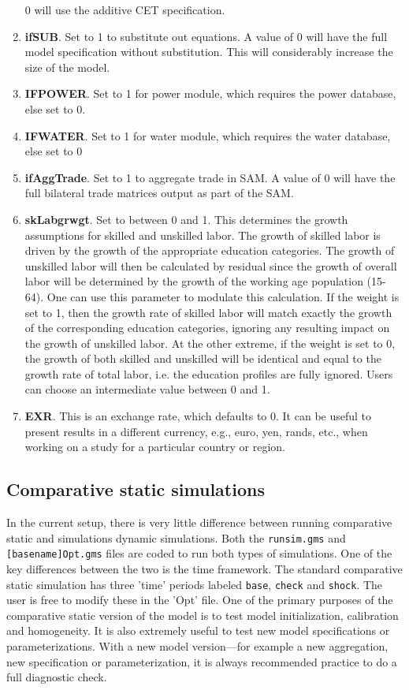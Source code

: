 \begin{enumerate}
         0 will use the additive CET specification.
   \item \textbf{ifSUB}. Set to 1 to substitute out equations. A value of 0 will
         have the full model specification without substitution. This will
         considerably increase the size of the model.
   \item \textbf{IFPOWER}. Set to 1 for power module, which requires the power
         database, else set to 0.
   \item \textbf{IFWATER}. Set to 1 for water module, which requires the water
         database, else set to 0
   \item \textbf{ifAggTrade}. Set to 1 to aggregate trade in SAM. A value of 0
         will have the full bilateral trade matrices output as part of the SAM.
   \item \textbf{skLabgrwgt}. Set to between 0 and 1. This determines the growth
         assumptions for skilled and unskilled labor. The growth of skilled
         labor is driven by the growth of the appropriate education categories.
         The growth of unskilled labor will then be calculated by residual since
         the growth of overall labor will be determined by the growth of the
         working age population (15-64). One can use this parameter to modulate
         this calculation. If the weight is set to 1, then the growth rate of
         skilled labor will match exactly the growth of the corresponding
         education categories, ignoring any resulting impact on the growth of
         unskilled labor. At the other extreme, if the weight is set to 0, the
         growth of both skilled and unskilled will be identical and equal to the
         growth rate of total labor, i.e. the education profiles are fully
         ignored. Users can choose an intermediate value between 0 and 1.
    \item \textbf{EXR}. This is an exchange rate, which defaults to 0. It can be useful to present results in a different currency, e.g., euro, yen, rands, etc., when working on a study for a particular country or region.
\end{enumerate}

\subsection{Comparative static simulations}

In the current setup, there is very little difference between running
comparative static and simulations dynamic simulations. Both the
\texttt{runsim.gms} and \texttt{[basename]Opt.gms} files are coded to run both
types of simulations. One of the key differences between the two is the time
framework. The standard comparative static simulation has three 'time' periods
labeled \texttt{base}, \texttt{check} and \texttt{shock}. The user is free to
modify these in the 'Opt' file. One of the primary purposes of the comparative
static version of the model is to test model initialization, calibration and
homogeneity. It is also extremely useful to test new model specifications or
parameterizations. With a new model version---for example a new aggregation, new
specification or parameterization, it is always recommended practice to do a
full diagnostic check.

